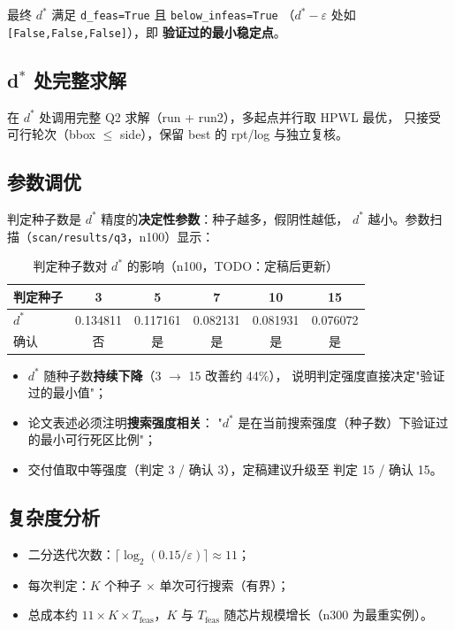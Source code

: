 \documentclass[12pt,a4paper]{article}
\begin{document}
最终 $d^*$ 满足 \texttt{d\_feas=True} 且 \texttt{below\_infeas=True}
（$d^*-\varepsilon$ 处如 \texttt{[False,\allowbreak False,\allowbreak False]}），即
\textbf{验证过的最小稳定点}。

\subsection{d$^*$ 处完整求解}

在 $d^*$ 处调用完整 Q2 求解（run + run2），多起点并行取 HPWL 最优，
只接受可行轮次（bbox $\le$ side），保留 best 的 rpt/log 与独立复核。

\subsection{参数调优}
\label{sec:q3seed}

判定种子数是 $d^*$ 精度的\textbf{决定性参数}：种子越多，假阴性越低，
$d^*$ 越小。参数扫描（\texttt{scan/results/q3}，n100）显示：

\begin{table}[H]
\centering
\small
\caption{判定种子数对 $d^*$ 的影响（n100，TODO：定稿后更新）}
\begin{tabular}{lccccc}
\toprule
判定种子 & 3 & 5 & 7 & 10 & 15 \\
\midrule
$d^*$ & 0.134811 & 0.117161 & 0.082131 & 0.081931 & 0.076072 \\
确认 & 否 & 是 & 是 & 是 & 是 \\
\bottomrule
\end{tabular}
\end{table}

\begin{itemize}
    \item $d^*$ 随种子数\textbf{持续下降}（3 $\to$ 15 改善约 44\%），
    说明判定强度直接决定"验证过的最小值"；
    \item 论文表述必须注明\textbf{搜索强度相关}：
    "$d^*$ 是在当前搜索强度（种子数）下验证过的最小可行死区比例"；
    \item 交付值取中等强度（判定 3 / 确认 3），定稿建议升级至
    判定 15 / 确认 15。
\end{itemize}

\subsection{复杂度分析}

\begin{itemize}
    \item 二分迭代次数：$\lceil \log_2(0.15/\varepsilon) \rceil \approx 11$；
    \item 每次判定：$K$ 个种子 $\times$ 单次可行搜索（有界）；
    \item 总成本约 $11 \times K \times T_{\text{feas}}$，$K$ 与
    $T_{\text{feas}}$ 随芯片规模增长（n300 为最重实例）。
\end{itemize}
\end{document}
